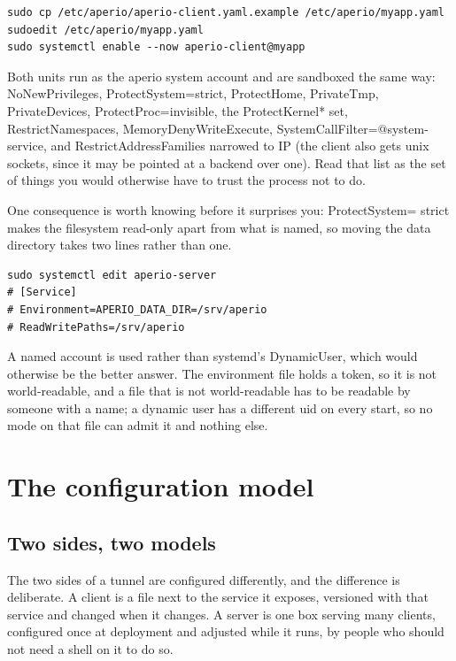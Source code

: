 \documentclass[11pt,a4paper,oneside]{book}
\newcommand{\aperiobreakableunderscore}{\textunderscore\allowbreak}
\newcommand{\aperiocodebreaks}{\XeTeXinterchartokenstate=1 }
\newcommand{\aperiocodebreaks}{}
\DeclareRobustCommand{\code}[1]{{\ttfamily\small\aperiocodebreaks
  \let\_\aperiobreakableunderscore#1}}
\begin{document}
\begin{lstlisting}[language=aperiosh]
sudo cp /etc/aperio/aperio-client.yaml.example /etc/aperio/myapp.yaml
sudoedit /etc/aperio/myapp.yaml
sudo systemctl enable --now aperio-client@myapp
\end{lstlisting}

Both units run as the \code{aperio} system account and are sandboxed the same
way: \code{NoNewPrivileges}, \code{ProtectSystem=strict}, \code{ProtectHome},
\code{PrivateTmp}, \code{PrivateDevices}, \code{ProtectProc=invisible}, the
\code{ProtectKernel*} set, \code{RestrictNamespaces},
\code{MemoryDenyWriteExecute}, \code{SystemCallFilter=@system-service}, and
\code{RestrictAddressFamilies} narrowed to IP (the client also gets unix
sockets, since it may be pointed at a backend over one). Read that list as the
set of things you would otherwise have to trust the process not to do.

One consequence is worth knowing before it surprises you: \code{ProtectSystem=%
strict} makes the filesystem read-only apart from what is named, so moving the
data directory takes two lines rather than one.

\begin{lstlisting}[language=aperiosh]
sudo systemctl edit aperio-server
# [Service]
# Environment=APERIO_DATA_DIR=/srv/aperio
# ReadWritePaths=/srv/aperio
\end{lstlisting}

A named account is used rather than systemd's \code{DynamicUser}, which would
otherwise be the better answer. The environment file holds a token, so it is
not world-readable, and a file that is not world-readable has to be readable
by someone with a name; a dynamic user has a different uid on every start, so
no mode on that file can admit it and nothing else.

\chapter{The configuration model}
\label{ch:config-model}

\section{Two sides, two models}

The two sides of a tunnel are configured differently, and the difference is
deliberate. A client is a file next to the service it exposes, versioned with
that service and changed when it changes. A server is one box serving many
clients, configured once at deployment and adjusted while it runs, by people
who should not need a shell on it to do so.
\end{document}
